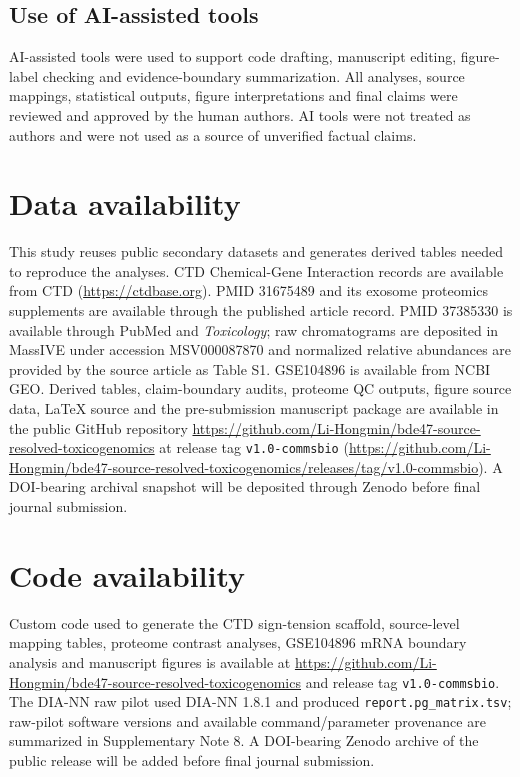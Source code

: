 \documentclass[11pt]{article}
\begin{document}
\subsection{Use of AI-assisted tools}
AI-assisted tools were used to support code drafting, manuscript editing, figure-label checking and evidence-boundary summarization. All analyses, source mappings, statistical outputs, figure interpretations and final claims were reviewed and approved by the human authors. AI tools were not treated as authors and were not used as a source of unverified factual claims.

\section{Data availability}
This study reuses public secondary datasets and generates derived tables needed to reproduce the analyses. CTD Chemical-Gene Interaction records are available from CTD (\url{https://ctdbase.org}). PMID 31675489 and its exosome proteomics supplements are available through the published article record. PMID 37385330 is available through PubMed and \emph{Toxicology}; raw chromatograms are deposited in MassIVE under accession MSV000087870 and normalized relative abundances are provided by the source article as Table S1. GSE104896 is available from NCBI GEO. Derived tables, claim-boundary audits, proteome QC outputs, figure source data, LaTeX source and the pre-submission manuscript package are available in the public GitHub repository \url{https://github.com/Li-Hongmin/bde47-source-resolved-toxicogenomics} at release tag \texttt{v1.0-commsbio} (\url{https://github.com/Li-Hongmin/bde47-source-resolved-toxicogenomics/releases/tag/v1.0-commsbio}). A DOI-bearing archival snapshot will be deposited through Zenodo before final journal submission.

\section{Code availability}
Custom code used to generate the CTD sign-tension scaffold, source-level mapping tables, proteome contrast analyses, GSE104896 mRNA boundary analysis and manuscript figures is available at \url{https://github.com/Li-Hongmin/bde47-source-resolved-toxicogenomics} and release tag \texttt{v1.0-commsbio}. The DIA-NN raw pilot used DIA-NN 1.8.1 and produced \texttt{report.pg\_matrix.tsv}; raw-pilot software versions and available command/parameter provenance are summarized in Supplementary Note 8. A DOI-bearing Zenodo archive of the public release will be added before final journal submission.
\end{document}
